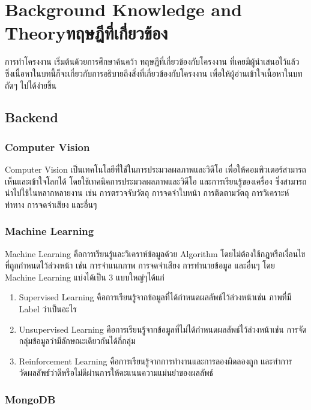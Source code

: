 \chapter{\ifenglish Background Knowledge and Theory\else ทฤษฎีที่เกี่ยวข้อง\fi}

การทำโครงงาน เริ่มต้นด้วยการศึกษาค้นคว้า ทฤษฎีที่เกี่ยวข้องกับโครงงาน ที่เคยมีผู้นำเสนอไว้แล้ว
\enskip ซึ่งเนื้อหาในบทนี้ก็จะเกี่ยวกับการอธิบายถึงสิ่งที่เกี่ยวข้องกับโครงงาน เพื่อให้ผู้อ่านเข้าใจเนื้อหาในบทถัดๆ ไปได้ง่ายขึ้น

\section{Backend}
\subsection{Computer Vision}
Computer Vision เป็นเทคโนโลยีที่ใช้ในการประมวลผลภาพและวิดีโอ
\enskip เพื่อให้คอมพิวเตอร์สามารถเห็นและเข้าใจโลกได้ โดยใช้เทคนิคการประมวลผลภาพและวิดีโอ 
\enskip และการเรียนรู้ของเครื่อง ซึ่งสามารถนำไปใช้ในหลากหลายงาน เช่น การตรวจจับวัตถุ การจดจำใบหน้า การติดตามวัตถุ การวิเคราะห์ท่าทาง การจดจำเสียง และอื่นๆ \cite{website:computervision}

\subsection{Machine Learning}
Machine Learning คือการเรียนรู้และวิเคราห์ข้อมูลด้วย Algorithm โดยไม่ต้องใช้กฎหรือเงื่อนไขที่ถูกกำหนดไว้ล่วงหน้า เช่น การจำแนกภาพ การจดจำเสียง การทำนายข้อมูล และอื่นๆ
\enskip โดย Machine Learning แบ่งได้เป็น 3 แบบใหญ่ๆได้แก่ \cite{website:machinelearning}
\begin{enumerate}
    \item Supervised Learning คือการเรียนรู้จากข้อมูลที่ได้กำหนดผลลัพธ์ไว้ล่วงหน้าเช่น ภาพที่มี Label ว่าเป็นอะไร
    \item Unsupervised Learning คือการเรียนรู้จากข้อมูลที่ไม่ได้กำหนดผลลัพธ์ไว้ล่วงหน้าเช่น การจัดกลุ่มข้อมูลว่ามีลักษณะเดียวกันได้กี่กลุ่ม
    \item Reinforcement Learning คือการเรียนรู้จากการทำงานและการลองผิดลองถูก และทำการวัดผลลัพธ์ว่าดีหรือไม่ดีผ่านการให้คะแนนความแม่นยำของผลลัพธ์
\end{enumerate}

\subsection{MongoDB}


